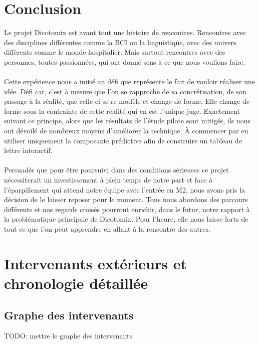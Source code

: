 \documentclass[11pt,a4paper]{article}
\theoremstyle{plain}
\theoremstyle{definition}
\begin{document}
\section{Conclusion}

Le projet Dicotomix est avant tout une histoire de rencontres. Rencontres avec des disciplines différentes comme la BCI ou la linguistique, avec des univers différents comme le monde hospitalier. 
Mais surtout rencontres avec des personnes, toutes passionnées, qui ont donné sens à ce que nous voulions faire. 
\paragraph{}Cette expérience nous a initié au défi que représente le fait de vouloir réaliser une idée. Défi car, 
c'est à mesure que l'on se rapproche de sa concrétisation, de son passage à la réalité, que celle-ci se re-modèle et change de forme. Elle change de forme sous la contrainte de cette réalité
qui en est l'unique juge. Exactement suivant ce principe, alors que les résultats de l'étude pilote sont mitigés, ils nous ont dévoilé de nombreux moyens d'améliorer la technique. À commencer par en utiliser
uniquement la composante prédictive afin de construire un tableau de lettre interactif.
\paragraph{}Persuadés que pour être poursuivi dans des conditions sérieuses ce projet nécessiterait un investissement à plein temps de notre part et face à l'éparpillement qui attend notre équipe avec l'entrée 
en M2, nous avons pris la décision de le laisser reposer pour le moment. Tous nous abordons des parcours différents et nos regards croisés pourront enrichir, dans le futur, notre rapport 
à la problématique principale de Dicotomix. Pour l'heure, elle nous laisse forts de tout ce que l'on peut apprendre en allant à la rencontre des autres.

\appendix
\section{Intervenants extérieurs et chronologie détaillée}
\subsection{Graphe des intervenants}
TODO: mettre le graphe des intervenants
\end{document}

